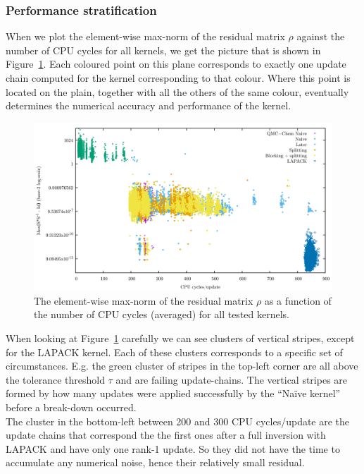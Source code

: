 \documentclass[11pt]{article}
\numberwithin{figure}{section}
\numberwithin{table}{section}
\begin{document}
      \subsubsection{Performance stratification}
        When we plot the element-wise max-norm of the residual matrix $\rho$ against the number of CPU cycles for all kernels, we get the picture that is shown in Figure~\ref{fig:pareto_all}. Each coloured point on this plane corresponds to exactly one update chain computed for the kernel corresponding to that colour. Where this point is located on the plain, together with all the others of the same colour, eventually determines the numerical accuracy and performance of the kernel.
		\begin{figure}[H]
		  \centering
		  \includegraphics[width=\linewidth]{pareto_pass_fail_all.png}	
		  \caption{The element-wise max-norm of the residual matrix $\rho$ as a function of the number of CPU cycles (averaged) for all tested kernels.}
		  \label{fig:pareto_all}
		\end{figure}
		When looking at Figure~\ref{fig:pareto_all} carefully we can see clusters of vertical stripes, except for the LAPACK kernel. Each of these clusters corresponds to a specific set of circumstances. E.g. the green cluster of stripes in the top-left corner are all above the tolerance threshold $\tau$ and are failing update-chains. The vertical stripes are formed by how many updates were applied successfully by the ``Na\"{i}ve kernel'' before a break-down occurred.\\
		
		The cluster in the bottom-left between 200 and 300 CPU cycles/update are the update chains that correspond the the first ones after a full inversion with LAPACK and have only one rank-1 update. So they did not have the time to accumulate any numerical noise, hence their relatively small residual.\\
		
\end{document}
